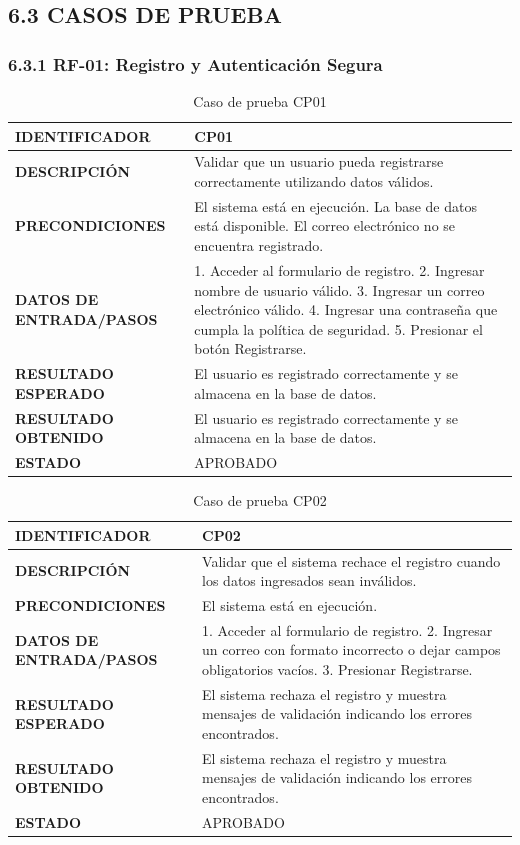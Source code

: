 \subsection{6.3 CASOS DE PRUEBA}

\subsubsection{6.3.1 RF-01: Registro y Autenticación Segura}

\begin{table}[H]
\centering
\caption{Caso de prueba CP01}
\begin{tabular}{|p{3.5cm}|p{10.3cm}|}
\hline
\textbf{IDENTIFICADOR} & CP01 \\
\hline
\textbf{DESCRIPCIÓN} & Validar que un usuario pueda registrarse correctamente utilizando datos válidos. \\
\hline
\textbf{PRECONDICIONES} & El sistema está en ejecución. La base de datos está disponible. El correo electrónico no se encuentra registrado. \\
\hline
\textbf{DATOS DE ENTRADA/PASOS} & 1. Acceder al formulario de registro. 2. Ingresar nombre de usuario válido. 3. Ingresar un correo electrónico válido. 4. Ingresar una contraseña que cumpla la política de seguridad. 5. Presionar el botón Registrarse. \\
\hline
\textbf{RESULTADO ESPERADO} & El usuario es registrado correctamente y se almacena en la base de datos. \\
\hline
\textbf{RESULTADO OBTENIDO} & El usuario es registrado correctamente y se almacena en la base de datos. \\
\hline
\textbf{ESTADO} & APROBADO \\
\hline
\end{tabular}
\end{table}

\begin{table}[H]
\centering
\caption{Caso de prueba CP02}
\begin{tabular}{|p{3.5cm}|p{10.3cm}|}
\hline
\textbf{IDENTIFICADOR} & CP02 \\
\hline
\textbf{DESCRIPCIÓN} & Validar que el sistema rechace el registro cuando los datos ingresados sean inválidos. \\
\hline
\textbf{PRECONDICIONES} & El sistema está en ejecución. \\
\hline
\textbf{DATOS DE ENTRADA/PASOS} & 1. Acceder al formulario de registro. 2. Ingresar un correo con formato incorrecto o dejar campos obligatorios vacíos. 3. Presionar Registrarse. \\
\hline
\textbf{RESULTADO ESPERADO} & El sistema rechaza el registro y muestra mensajes de validación indicando los errores encontrados. \\
\hline
\textbf{RESULTADO OBTENIDO} & El sistema rechaza el registro y muestra mensajes de validación indicando los errores encontrados. \\
\hline
\textbf{ESTADO} & APROBADO \\
\hline
\end{tabular}
\end{table}

